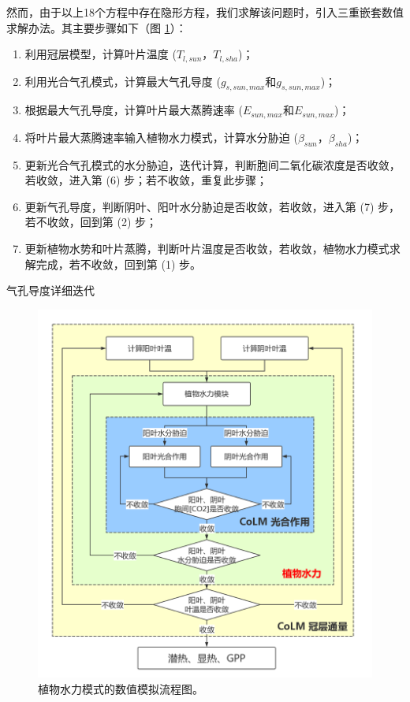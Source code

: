 然而，由于以上18个方程中存在隐形方程，我们求解该问题时，引入三重嵌套数值求解办法。其主要步骤如下（图 \ref{fig:植物水力模式的数值模拟流程图}）：
\begin{enumerate}
    \item 利用冠层模型，计算叶片温度 ($T_{l,sun}$，$T_{l,sha}$)；
    \item 利用光合气孔模式，计算最大气孔导度 ($g_{s,sun,max}$和$g_{s,sun,max}$)；
    \item 根据最大气孔导度，计算叶片最大蒸腾速率 ($E_{sun,max}$和$E_{sun,max}$)；
    \item 将叶片最大蒸腾速率输入植物水力模式，计算水分胁迫 ($\beta_{sun}$，$\beta_{sha}$)；
    \item 更新光合气孔模式的水分胁迫，迭代计算，判断胞间二氧化碳浓度是否收敛，若收敛，进入第 (6) 步；若不收敛，重复此步骤；
    \item 更新气孔导度，判断阴叶、阳叶水分胁迫是否收敛，若收敛，进入第 (7) 步，若不收敛，回到第 (2) 步；
    \item 更新植物水势和叶片蒸腾，判断叶片温度是否收敛，若收敛，植物水力模式求解完成，若不收敛，回到第 (1) 步。
\end{enumerate}

气孔导度详细迭代

{
    \begin{figure}[htbp]
    \centering
    \includegraphics{Figures/植被水力模式/植物水力模式的数值模拟流程图.png}
    \caption{植物水力模式的数值模拟流程图。}
    \label{fig:植物水力模式的数值模拟流程图}
    \end{figure}
}

